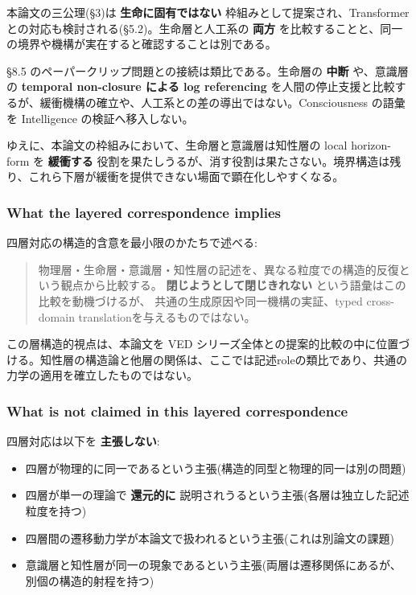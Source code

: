 本論文の三公理(\S{}3)は \textbf{生命に固有ではない} 枠組みとして提案され、Transformer との対応も検討される(\S{}5.2)。生命層と人工系の \textbf{両方} を比較することと、同一の境界や機構が実在すると確認することは別である。

\S{}8.5 のペーパークリップ問題との接続は類比である。生命層の \textbf{中断} や、意識層の \textbf{temporal non-closure による log referencing} を人間の停止支援と比較するが、緩衝機構の確立や、人工系との差の導出ではない。Consciousness の語彙を Intelligence の検証へ移入しない。

ゆえに、本論文の枠組みにおいて、生命層と意識層は知性層の local horizon-form を \textbf{緩衝する} 役割を果たしうるが、消す役割は果たさない。境界構造は残り、これら下層が緩衝を提供できない場面で顕在化しやすくなる。

\subsubsection{What the layered correspondence implies}


四層対応の構造的含意を最小限のかたちで述べる:

\begin{quote}
物理層・生命層・意識層・知性層の記述を、異なる粒度での構造的反復という観点から比較する。
\textbf{閉じようとして閉じきれない} という語彙はこの比較を動機づけるが、
共通の生成原因や同一機構の実証、typed cross-domain translationを与えるものではない。
\end{quote}

この層構造的視点は、本論文を VED シリーズ全体との提案的比較の中に位置づける。知性層の構造論と他層の関係は、ここでは記述roleの類比であり、共通の力学の適用を確立したものではない。

\subsubsection{What is not claimed in this layered correspondence}


四層対応は以下を \textbf{主張しない}:

\begin{itemize}
\item 四層が物理的に同一であるという主張(構造的同型と物理的同一は別の問題)
\item 四層が単一の理論で \textbf{還元的に} 説明されうるという主張(各層は独立した記述粒度を持つ)
\item 四層間の遷移動力学が本論文で扱われるという主張(これは別論文の課題)
\item 意識層と知性層が同一の現象であるという主張(両層は遷移関係にあるが、別個の構造的射程を持つ)
\end{itemize}

